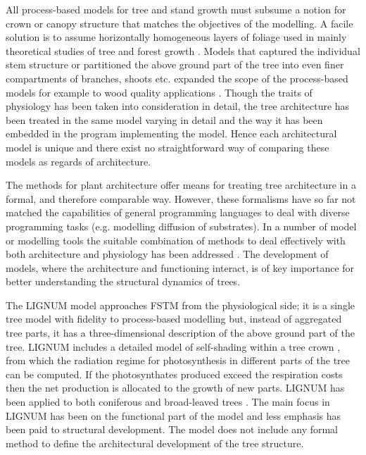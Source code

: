 All  process-based  models  \citep{landsberg:86}  for tree  and  stand
growth  must subsume  a  notion  for crown  or  canopy structure  that
matches  the objectives  of the  modelling.  A  facile solution  is to
assume  horizontally  homogeneous layers  of  foliage  used in  mainly
theoretical     studies     of      tree     and     forest     growth
\citep{hari:82,makela:97-1}.  Models that captured the individual stem
structure or partitioned  the above ground part of  the tree into even
finer  compartments  of  branches,  shoots  etc.  \citep{kellomaki:95}  
expanded the  scope  of the  process-based models  for
example to wood  quality applications \citep{kellomaki:99, makela:03}.
Though the traits  of physiology has been taken  into consideration in
detail,  the tree  architecture has  been  treated in  the same  model
varying in  detail and  the way  it has been  embedded in  the program
implementing the  model.  Hence each architectural model  is unique and
there  exist  no straightforward  way  of  comparing  these models  as
regards of architecture.


The methods  for plant architecture \citep{pp:90,dereffye:97,godin:99}
offer means for treating tree  architecture in a formal, and therefore
comparable way. However, these formalisms  have so far not matched the
capabilities  of general  programming languages  to deal  with diverse
programming  tasks (e.g.   modelling  diffusion of  substrates). In  a
number of model or modelling tools the suitable combination of methods
to  deal effectively  with both  architecture and  physiology  has been
addressed \citep{kurth:99,  eschenbach:00, karwowski:03, yan:04}.  The
development  of   models,  where  the   architecture  and  functioning
interact, is of key importance for better understanding the structural
dynamics of trees.

The LIGNUM model approaches FSTM  from the physiological side; it is a
single tree model  \citep{perttunen:96} with fidelity to process-based
modelling  \citep[see  e.g.][]{nikinmaa:92, sievanen:93,  makela:97-1}
but,  instead of  aggregated tree  parts, it  has  a three-dimensional
description of the  above ground part of the  tree.  LIGNUM includes a
detailed    model    of    self-shading    within   a    tree    crown
\citep{perttunen:98,  perttunen:01}, from  which the  radiation regime
for photosynthesis in different parts of the tree can be computed.  If
the photosynthates produced exceed  the respiration costs then the net
production is allocated  to the growth of new  parts.  LIGNUM has been
applied to both coniferous \citep{perttunen:96,lo:99} and broad-leaved
trees \citep{perttunen:01}.  The main focus  in LIGNUM has been on the
functional  part of  the  model and  less  emphasis has  been paid  to
structural development.  The model  does not include any formal method
to define the architectural development of the tree structure.

